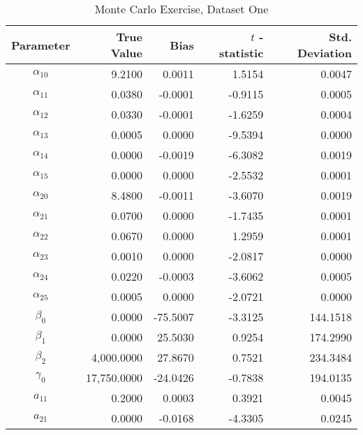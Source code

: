 \begin{table}\onehalfspacing
\begin{center}
\begin{threeparttable}
  \caption{Monte Carlo Exercise, Dataset One}
  \label{Monte Carlo: One}
  \begin{tabular}{crrrr}\toprule

  Parameter & True Value & Bias & $t$ - statistic & Std. Deviation \\
  \midrule
  $\alpha_{10}$ &     \phantom{20000}9.2100 &    \phantom{-17}0.0011 &     1.5154 &      0.0047 \\
  $\alpha_{11}$ &     0.0380 &     -0.0001 &      -0.9115 &       0.0005 \\
  $\alpha_{12}$ &     0.0330 &     -0.0001 &     -1.6259 &       0.0004 \\
  $\alpha_{13}$ &     0.0005 &      0.0000 &     -9.5394 &       0.0000 \\
  $\alpha_{14}$ &     0.0000 &     -0.0019 &     -6.3082 &       0.0019 \\
  $\alpha_{15}$ &     0.0000 &      0.0000 &     -2.5532 &       0.0001 \\
  $\alpha_{20}$ &     8.4800 &     -0.0011 &     -3.6070 &       0.0019 \\
  $\alpha_{21}$ &     0.0700 &      0.0000 &     -1.7435 &       0.0001 \\
  $\alpha_{22}$ &     0.0670 &     0.0000  &       1.2959  &        0.0001 \\
  $\alpha_{23}$ &     0.0010 &     0.0000  &      -2.0817  &        0.0000\\
  $\alpha_{24}$ &     0.0220 &     -0.0003  &        -3.6062  &        0.0005 \\
  $\alpha_{25}$ &     0.0005 &     0.0000  &       -2.0721  &        0.0000\\
  $\beta_{0}$   &     0.0000 &    -75.5007 &     -3.3125 &     144.1518 \\
  $\beta_{1}$   &     0.0000 &     25.5030 &     0.9254 &     174.2990 \\
  $\beta_{2}$   &  4,000.0000 &    27.8670 &     0.7521 &     234.3484 \\
  $\gamma_{0}$  & 17,750.0000 &   -24.0426 &     -0.7838 &     194.0135 \\
  $a_{11}$      &     0.2000 &     0.0003 &     0.3921 &       0.0045 \\
  $a_{21}$      &     0.0000 &     -0.0168 &     -4.3305 &       0.0245 \\

\end{tabular}
\end{threeparttable}
\end{center}
\end{table}
